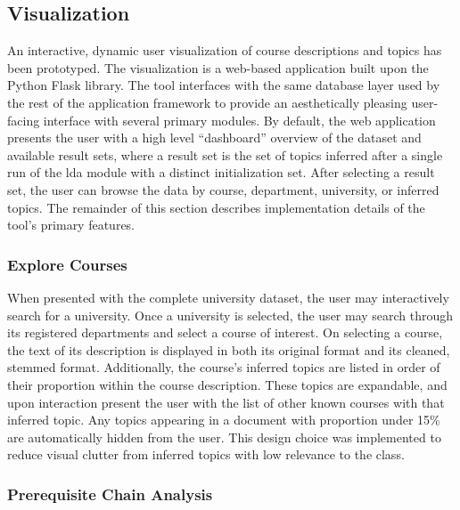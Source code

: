 \subsection{Visualization}
\label{sec:visualization}


An interactive, dynamic user visualization of course descriptions and topics has been prototyped.
The visualization is a web-based application built upon the Python Flask library.
The tool interfaces with the same database layer used by the rest of the application framework to provide an aesthetically pleasing user-facing interface with several primary modules.
By default, the web application presents the user with a high level ``dashboard'' overview of the dataset and available result sets, where a result set is the set of topics inferred after a single run of the \ac{lda} module with a distinct initialization set.
After selecting a result set, the user can browse the data by course, department, university, or inferred topics.
The remainder of this section describes implementation details of the tool's primary features.


\subsubsection{Explore Courses}
\label{sec:vis-course}


When presented with the complete university dataset, the user may interactively search for a university.
Once a university is selected, the user may search through its registered departments and select a course of interest.
On selecting a course, the text of its description is displayed in both its original format and its cleaned, stemmed format.
Additionally, the course's inferred topics are listed in order of their proportion within the course description.
These topics are expandable, and upon interaction present the user with the list of other known courses with that inferred topic.
Any topics appearing in a document with proportion under 15\% are automatically hidden from the user.
This design choice was implemented to reduce visual clutter from inferred topics with low relevance to the class.


\subsubsection{Prerequisite Chain Analysis}
\label{sec:vis-prerequisites}

